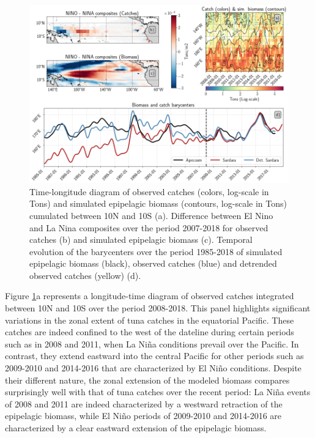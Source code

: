 \begin{figure}[h!tp]
	\centering
	\includegraphics[scale=0.4]{figs/plot_validation_apecosm.png}
	\caption{Time-longitude diagram of observed catches (colors, log-scale in Tons) and simulated epipelagic biomass (contours, log-scale in Tons) cumulated between 10N and 10S (a). Difference between El Nino and La Nina composites over the period 2007-2018 for observed catches (b) and simulated epipelagic biomass (c). Temporal evolution of the barycenters over the period 1985-2018 of simulated epipelagic biomass (black), observed catches (blue) and detrended observed catches (yellow) (d).}
	\label{fig:apecosm_validation}
\end{figure}


Figure \ref{fig:apecosm_validation}a represents a longitude-time diagram of observed catches integrated between 10N and 10S over the period 2008-2018. This panel highlights significant variations in the zonal extent of tuna catches in the equatorial Pacific. These catches are indeed confined to the west of the dateline during certain periods such as in 2008 and 2011, when La Niña conditions prevail over the Pacific. In contrast, they extend eastward into the central Pacific for other periods such as 2009-2010 and 2014-2016 that are characterized by El Niño conditions. Despite their different nature, the zonal extension of the modeled biomass compares surprisingly well with that of tuna catches over the recent period: La Niña events of 2008 and 2011 are indeed characterized by a westward retraction of the epipelagic biomass, while El Niño periods of 2009-2010 and 2014-2016 are characterized by a clear eastward extension of the epipelagic biomass. 

